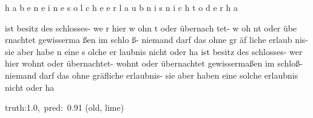 \documentclass[a4paper,10pt,twoside]{article}
\begin{document}
{\color[rgb]{0.151,0,0} h}{\color[rgb]{0.0,0,0} a}{\color[rgb]{0.0,0,0} b}{\color[rgb]{0.0,0,0} e}{\color[rgb]{0.0,0,0} n} {\color[rgb]{0.0,0,0} e}{\color[rgb]{0.0,0,0} i}{\color[rgb]{0.128,0,0} n}{\color[rgb]{0.0,0,0} e} {\color[rgb]{0.046,0,0} s}{\color[rgb]{0.0,0,0} o}{\color[rgb]{0.17,0,0} l}{\color[rgb]{0.0,0,0} c}{\color[rgb]{1,0,0} h}{\color[rgb]{0.0,0,0} e} {\color[rgb]{0.0,0,0} e}{\color[rgb]{0.0,0,0} r}{\color[rgb]{0.0,0,0} l}{\color[rgb]{0.18,0,0} a}{\color[rgb]{0.626,0,0} u}{\color[rgb]{0.0,0,0} b}{\color[rgb]{0.263,0,0} n}{\color[rgb]{0.0,0,0} i}{\color[rgb]{0.0,0,0} s} {\color[rgb]{1,0,0} n}{\color[rgb]{1,0,0} i}{\color[rgb]{1,0,0} c}{\color[rgb]{1,0,0} h}{\color[rgb]{1,0,0} t} {\color[rgb]{0.0,0,0} o}{\color[rgb]{0.118,0,0} d}{\color[rgb]{0.0,0,0} e}{\color[rgb]{0.0,0,0} r} {\color[rgb]{0.0,0,0} h}{\color[rgb]{0.0,0,0} a}

ist besitz des schlosses- {\color[rgb]{1,0,0} w}e{\color[rgb]{0,0,1} r} hier w{\color[rgb]{1,0,0} o}hn{\color[rgb]{1,0,0} t} oder {\color[rgb]{0,0,1} ü}bernach{\color[rgb]{1,0,0} t}et- w{\color[rgb]{0,0,1} o}h{\color[rgb]{1,0,0} n}t oder übe{\color[rgb]{0,0,1} r}nachtet gewisserma{\color[rgb]{1,0,0} ß}en im schlo{\color[rgb]{1,0,0} ß}- niemand {\color[rgb]{0,0,1} d}arf das ohne gr{\color[rgb]{1,0,0} ä}f{\color[rgb]{0,0,1} l}iche erlaub{\color[rgb]{1,0,0} n}is- sie aber habe{\color[rgb]{1,0,0} n} eine s{\color[rgb]{0,0,1} o}lche er{\color[rgb]{0,0,1} l}aubnis {\color[rgb]{1,0,0} n}icht oder ha ist besitz des schlosses- wer hier wohnt oder übernachtet- wohnt oder übernachtet gewissermaßen im schloß- niemand darf das ohne gräfliche erlaubnis- sie aber haben eine solche {\color[rgb]{1,0,0} erlaubnis} nicht {\color[rgb]{0,0,1} oder} ha

 {\footnotesize {\color[rgb]{0.6, 0.6, 0.6}truth:1.0,~pred:~0.91}} (old, lime)\hrulefill
\end{document}
